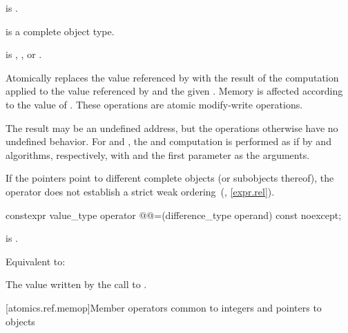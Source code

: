 \begin{itemdescr}
\pnum
\constraints
{} is .

\pnum
\mandates
{} is a complete object type.

\pnum
\expects
{} is ,
, or
.

\pnum
\effects
Atomically replaces the value referenced by 
with the result of the computation applied to
the value referenced by  and the given .
Memory is affected according to the value of .
These operations are atomic modify-write operations.

\pnum
\remarks
The result may be an undefined address,
but the operations otherwise have no undefined behavior.
For  and ,
the  and  computation is performed
as if by  and  algorithms, respectively,
with  and the first parameter as the arguments.
\begin{note}
If the pointers point to different complete objects (or subobjects thereof),
the \tcode{<} operator does not establish
a strict weak ordering~(, \ref{expr.rel}).
\end{note}
\end{itemdescr}

%
%
\begin{itemdecl}
constexpr value_type operator @@=(difference_type operand) const noexcept;
\end{itemdecl}

\begin{itemdescr}
\pnum
\constraints
{} is .

\pnum
\effects
Equivalent to:

\pnum
\returns
The value written by the call to .
\end{itemdescr}

[atomics.ref.memop]{Member operators
                          common to integers and pointers to objects}

